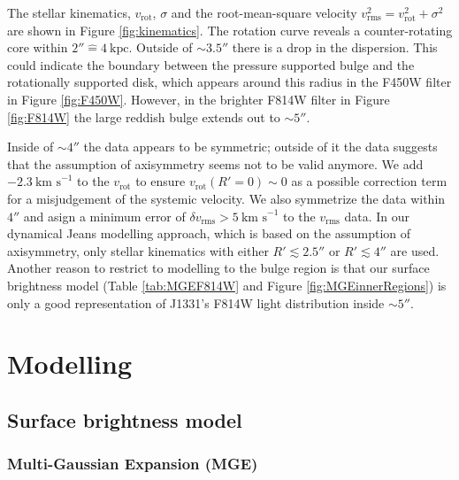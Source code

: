 \documentclass[useAMS,usenatbib]{mnras}
\begin{document}
The stellar kinematics, $v_\text{rot}$, $\sigma$ and the root-mean-square velocity $v_\text{rms}^2=v_\text{rot}^2 + \sigma^2$ are shown in Figure \ref{fig:kinematics}. The rotation curve reveals a counter-rotating core within $2''\hat{=}4~\text{kpc}$. Outside of $\sim 3.5''$ there is a drop in the dispersion. This could indicate the boundary between the pressure supported bulge and the rotationally supported disk, which appears around this radius in the F450W filter in Figure \ref{fig:F450W}. However, in the brighter F814W filter in Figure \ref{fig:F814W} the large reddish bulge extends out to $\sim5''$. 

Inside of $\sim 4''$ the data appears to be symmetric; outside of it the data suggests that the assumption of axisymmetry seems not to be valid anymore. We add $-2.3~\text{km s}^{-1}$ to the $v_\text{rot}$ to ensure $v_\text{rot}(R'=0) \sim 0$ as a possible correction term for a misjudgement of the systemic velocity. We also symmetrize the data within $4''$ and asign a minimum error of $\delta v_\text{rms} > 5~\text{km s}^{-1}$ to the $v_\text{rms}$ data. In our dynamical Jeans modelling approach, which is based on the assumption of axisymmetry, only stellar kinematics with either $R'  \lesssim 2.5''$ or $R' \lesssim 4''$ are used. Another reason to restrict to modelling to the bulge region is that our surface brightness model (Table \ref{tab:MGEF814W} and Figure \ref{fig:MGEinnerRegions}) is only a good representation of J1331's F814W light distribution inside $\sim 5''$.

\section{Modelling} \label{sec:Modelling}

\subsection{Surface brightness model} \label{sec:MGE_theo}

\subsubsection{Multi-Gaussian Expansion (MGE)}
\end{document}
